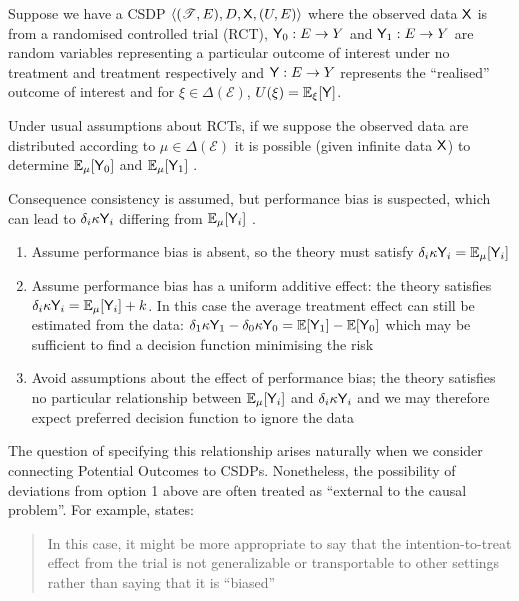 \begin{example}\label{ex:nonst_distn}
Suppose we have a CSDP $\langle (\mathscr{T}, E), D, \mathsf{X}, (U,E) \rangle$ where the observed data $\mathsf{X}$ is from a randomised controlled trial (RCT), $\mathsf{Y}_0:E\to Y$ and $\mathsf{Y}_1:E\to Y$ are random variables representing a particular outcome of interest under no treatment and treatment respectively and $\mathsf{Y}:E\to Y$ represents the ``realised'' outcome of interest and for $\xi\in \Delta(\mathcal{E})$, $U(\xi) = \mathbb{E}_{\xi}[\mathsf{Y}]$. 

Under usual assumptions about RCTs, if we suppose the observed data are distributed according to $\mu \in \Delta(\mathcal{E})$ it is possible (given infinite data $\mathsf{X}$) to determine $\mathbb{E}_\mu[\mathsf{Y}_0]$ and $\mathbb{E}_\mu[\mathsf{Y}_1]$ \citep{rubin_causal_2005}.

Consequence consistency is assumed, but performance bias is suspected, which can lead to $\delta_i \kappa \mathsf{Y}_i$ differing from $\mathbb{E}_\mu[\mathsf{Y}_i]$ \citep{mansournia_biases_2017}.
\begin{enumerate}
    \item Assume performance bias is absent, so the theory must satisfy $\delta_i \kappa \mathsf{Y}_i = \mathbb{E}_\mu[\mathsf{Y}_i]$
    \item Assume performance bias has a uniform additive effect: the theory satisfies $\delta_i \kappa \mathsf{Y}_i = \mathbb{E}_\mu[\mathsf{Y}_i]+k$. In this case the average treatment effect can still be estimated from the data: $\delta_1 \kappa \mathsf{Y}_1 - \delta_0\kappa\mathsf{Y}_0 = \mathbb{E}[\mathsf{Y}_1]-\mathbb{E}[\mathsf{Y}_0]$ which may be sufficient to find a decision function minimising the risk
    \item Avoid assumptions about the effect of performance bias; the theory satisfies no particular relationship between $\mathbb{E}_\mu[\mathsf{Y}_i]$ and $\delta_i \kappa \mathsf{Y}_i$ and we may therefore expect preferred decision function to ignore the data
\end{enumerate}
The question of specifying this relationship arises naturally when we consider connecting Potential Outcomes to CSDPs. Nonetheless, the possibility of deviations from option 1 above are often treated as ``external to the causal problem''. For example,  \cite{mansournia_biases_2017} states:
\begin{quote}
    In this case, it might be more appropriate to say that the intention-to-treat effect from the trial is not generalizable or transportable to other settings rather than saying that it is “biased”
\end{quote}
\end{example}
